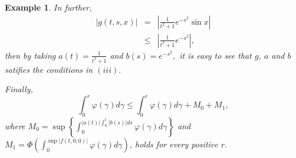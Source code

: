 \documentclass{amsart}
\theoremstyle{plain}
\newtheorem{example}{Example}
\numberwithin{equation}{section}
\begin{document}
\begin{example}
In further,\begin{eqnarray*}
\left\vert g\left( t,s,x\right) \right\vert &=&\left\vert \frac{1}{t^{2}+1}e^{-s^{2}}\sin x\right\vert \\
&\leqslant &\left\vert \frac{1}{t^{2}+1}e^{-s^{2}}\right\vert ,
\end{eqnarray*}then by taking $a\left( t\right) =\frac{1}{t^{2}+1}$ and $b\left( s\right)
=e^{-s^{2}},$ it is easy to see that $g$, $a$ and $b$ satifies the
conditions in $\left( iii\right) .$

Finally,\begin{equation*}
\int_{0}^{r}\varphi \left( \gamma \right) d\gamma \leqslant
\int_{0}^{r}\varphi \left( \gamma \right) d\gamma +M_{0}+M_{1},
\end{equation*}where $M_{0}=\sup \left\{ \int_{0}^{\left\vert a\left( t\right) \right\vert
\int_{0}^{t}\left\vert b\left( s\right) \right\vert ds}\varphi \left( \gamma
\right) d\gamma \right\} $ and $M_{1}=\Phi \left( \int_{0}^{\sup \left\vert
f\left( t,0,0\right) \right\vert }\varphi \left( \gamma \right) d\gamma
\right) $, holds for every positive $r.$
\end{example}
\end{document}
